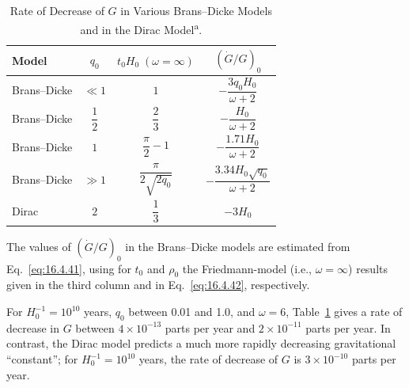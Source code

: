\begingroup
\renewcommand{\thetable}{16.1}
\begin{table}[htbp]
  \centering
  \caption{Rate of Decrease of \(G\) in Various Brans--Dicke Models and in
  the Dirac Model\textsuperscript{a}.}
  \label{tab:16.1}
  \small
  \setlength{\tabcolsep}{15pt}
  \begin{tabular}{@{}lccc@{}}
    \toprule
    Model &
    \(q_0\) &
    \(t_0H_0\;(\omega=\infty)\) &
    \((\dot G/G)_0\) \\
    \midrule
    Brans--Dicke &
    \(\ll1\) &
    \(1\) &
    \(-\dfrac{3q_0H_0}{\omega+2}\) \\[7pt]
    Brans--Dicke &
    \(\dfrac12\) &
    \(\dfrac23\) &
    \(-\dfrac{H_0}{\omega+2}\) \\[7pt]
    Brans--Dicke &
    \(1\) &
    \(\dfrac{\pi}{2}-1\) &
    \(-\dfrac{1.71H_0}{\omega+2}\) \\[7pt]
    Brans--Dicke &
    \(\gg1\) &
    \(\dfrac{\pi}{2\sqrt{2q_0}}\) &
    \(-\dfrac{3.34H_0\sqrt{q_0}}{\omega+2}\) \\[7pt]
    Dirac &
    \(2\) &
    \(\dfrac13\) &
    \(-3H_0\) \\
    \bottomrule
  \end{tabular}

  \vspace{0.5em}
  \begin{minipage}{0.94\linewidth}
    \footnotesize
    The values of \((\dot G/G)_0\) in the Brans--Dicke models are estimated
    from Eq.~\eqref{eq:16.4.41}, using for \(t_0\) and \(\rho_0\) the
    Friedmann-model (i.e., \(\omega=\infty\)) results given in the third
    column and in Eq.~\eqref{eq:16.4.42}, respectively.
  \end{minipage}
\end{table}
\endgroup

For \(H_0^{-1}=10^{10}\) years, \(q_0\) between 0.01 and 1.0, and
\(\omega=6\), Table~\ref{tab:16.1} gives a rate of decrease in \(G\) between
\(4\times10^{-13}\) parts per year and \(2\times10^{-11}\) parts per year.
In contrast, the Dirac model predicts a much more rapidly decreasing
gravitational ``constant''; for \(H_0^{-1}=10^{10}\) years, the rate of
decrease of \(G\) is \(3\times10^{-10}\) parts per year.

